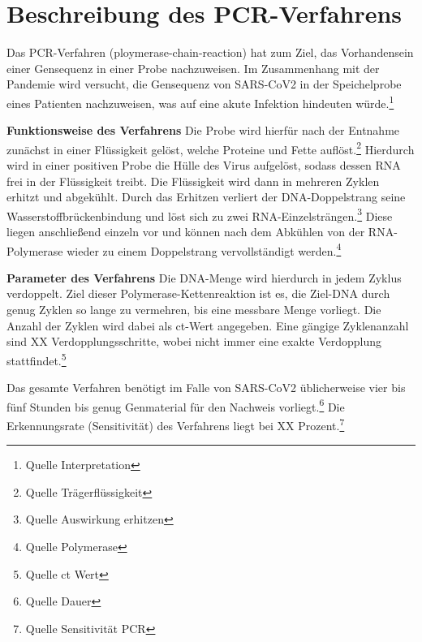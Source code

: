 \cleardoublepage

\section{Beschreibung des PCR-Verfahrens}
Das PCR-Verfahren (ploymerase-chain-reaction) hat zum Ziel, das Vorhandensein einer Gensequenz in einer Probe nachzuweisen.
Im Zusammenhang mit der Pandemie wird versucht, die Gensequenz von SARS-CoV2 in der Speichelprobe eines Patienten nachzuweisen, was auf eine akute Infektion hindeuten würde.\footnote{Quelle Interpretation}

\textbf{Funktionsweise des Verfahrens}\newline
Die Probe wird hierfür nach der Entnahme zunächst in einer Flüssigkeit gelöst, welche Proteine und Fette auflöst.\footnote{Quelle Trägerflüssigkeit}
Hierdurch wird in einer positiven Probe die Hülle des Virus aufgelöst, sodass dessen RNA frei in der Flüssigkeit treibt.
Die Flüssigkeit wird dann in mehreren Zyklen erhitzt und abgekühlt.
Durch das Erhitzen verliert der DNA-Doppelstrang seine Wasserstoffbrückenbindung und löst sich zu zwei RNA-Einzelsträngen.\footnote{Quelle Auswirkung erhitzen}
Diese liegen anschließend einzeln vor und können nach dem Abkühlen von der RNA-Polymerase wieder zu einem Doppelstrang vervollständigt werden.\footnote{Quelle Polymerase}

\textbf{Parameter des Verfahrens}\newline
Die DNA-Menge wird hierdurch in jedem Zyklus verdoppelt.
Ziel dieser Polymerase-Kettenreaktion ist es, die Ziel-DNA durch genug Zyklen so lange zu vermehren, bis eine messbare Menge vorliegt.
Die Anzahl der Zyklen wird dabei als ct-Wert angegeben.
Eine gängige Zyklenanzahl sind XX Verdopplungsschritte, wobei nicht immer eine exakte Verdopplung stattfindet.\footnote{Quelle ct Wert}

Das gesamte Verfahren benötigt im Falle von SARS-CoV2 üblicherweise vier bis fünf Stunden bis genug Genmaterial für den Nachweis vorliegt.\footnote{Quelle Dauer}
Die Erkennungsrate (Sensitivität) des Verfahrens liegt bei XX Prozent.\footnote{Quelle Sensitivität PCR}

\cleardoublepage

